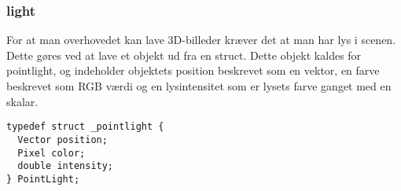 \subsubsection{light}
For at man overhovedet kan lave 3D-billeder kræver det at man har lys i scenen. Dette gøres ved at lave et objekt ud fra en struct. Dette objekt kaldes for pointlight, og indeholder objektets position beskrevet som en vektor, en farve beskrevet som RGB værdi og en lysintensitet som er lysets farve ganget med en skalar.

\begin{lstlisting}[style=Cstyle, caption=light struct]
typedef struct _pointlight {
  Vector position;
  Pixel color;
  double intensity;
} PointLight;
\end{lstlisting}